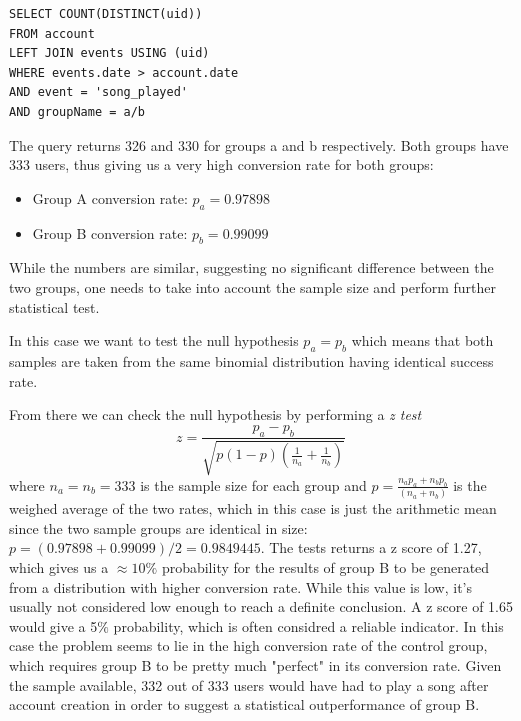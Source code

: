 \documentclass[paper=a4, fontsize=10pt]{report}
\begin{document}
\footnotesize
\begin{lstlisting}[frame=single,caption=Return conversion rates \label{code:sql_average_fixed_table}]
SELECT COUNT(DISTINCT(uid)) 
FROM account 
LEFT JOIN events USING (uid)
WHERE events.date > account.date
AND event = 'song_played'
AND groupName = a/b
\end{lstlisting}
\normalsize

The query returns 326 and 330 for groups a and b respectively. Both groups have 333 users, thus giving us a very high conversion rate for both groups:
\begin{itemize}
 \item Group A conversion rate: $p_{a} = 0.97898$
 \item Group B conversion rate: $p_{b} = 0.99099$
\end{itemize}


While the numbers are similar, suggesting no significant difference between the two groups, one needs to take into account the sample size and perform
further statistical test.


In this case we want to test the null hypothesis $p_{a} = p_{b}$ which means that both samples are taken from the same binomial distribution having identical
success rate.


From there we can check the null hypothesis by performing a \textit{z test}
\begin{equation}
 z = \frac{p_{a}-p_{b}}{\sqrt{p(1-p)(\frac{1}{n_{a}} + \frac{1}{n_{b}})}}
\end{equation}
where $n_{a} = n_{b} = 333 $ is the sample size for each group and $ p = \frac{n_{a}p_{a} + n_{b}p_{b}}{ (n_{a} + n_{b})}$ is the weighed average of the two rates,
which in this case is just the arithmetic mean since the two sample groups are identical in size: $p = (0.97898 + 0.99099)/2 = 0.9849445
$. The tests returns a z score of 1.27, which gives us a $\approx 10\%$ probability for the results of group B to be generated from a distribution with higher
conversion rate.
While this value is low, it's usually not considered low enough to reach a definite conclusion. A z score of 1.65 would give a 5$\%$ probability,
which is often considred a reliable indicator. In this case the problem seems to lie in the high conversion rate of the control group,
which requires group B to be pretty much "perfect" in its conversion rate. Given the sample available, 332 out of 333
users would have had to play a song after account creation in order to suggest a statistical outperformance of group B. 
\end{document}

